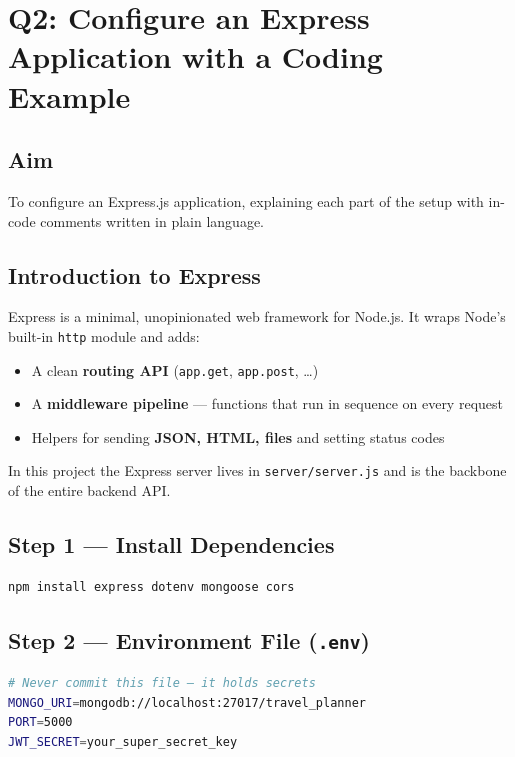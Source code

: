 \documentclass[12pt,a4paper]{article}
\begin{document}
\newpage

\section{Q2: Configure an Express Application with a Coding Example}

\subsection{Aim}
To configure an Express.js application, explaining each part of the setup with
in-code comments written in plain language.

\subsection{Introduction to Express}
Express is a minimal, unopinionated web framework for Node.js. It wraps Node's
built-in \texttt{http} module and adds:
\begin{itemize}
  \item A clean \textbf{routing API} (\texttt{app.get}, \texttt{app.post}, \ldots)
  \item A \textbf{middleware pipeline} — functions that run in sequence on every request
  \item Helpers for sending \textbf{JSON, HTML, files} and setting status codes
\end{itemize}

In this project the Express server lives in \texttt{server/server.js} and is the
backbone of the entire backend API.

\subsection{Step 1 — Install Dependencies}

\begin{lstlisting}[language=bash]
npm install express dotenv mongoose cors
\end{lstlisting}

\subsection{Step 2 — Environment File (\texttt{.env})}

\begin{lstlisting}[language=bash]
# Never commit this file — it holds secrets
MONGO_URI=mongodb://localhost:27017/travel_planner
PORT=5000
JWT_SECRET=your_super_secret_key
\end{lstlisting}
\end{document}
